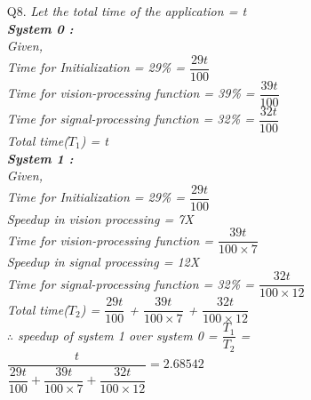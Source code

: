 \documentclass[letterpaper]{article}
\begin{document}
\begin{large}
\begin{flushleft}
\begin{enumerate}
\item[Q8.]
\textit{Let the total time of the application = t\\[0.05in]
\textbf{System 0 :}\\[0.05in]
Given,\\[0.05in]
Time for Initialization = 29\% = $\dfrac{29t}{100}$\\[0.05in]
Time for vision-processing function = 39\% = $\dfrac{39t}{100}$\\[0.05in]
Time for signal-processing function = 32\% = $\dfrac{32t}{100}$\\[0.05in]
Total time($T_1$) = t\\[0.1in]
\textbf{System 1 :}\\[0.05in]
Given,\\[0.05in]
Time for Initialization = 29\% = $\dfrac{29t}{100}$\\[0.05in]
Speedup in vision processing = 7X\\[0.05in]
Time for vision-processing function = $\dfrac{39t}{100\times 7}$\\[0.05in]
Speedup in signal processing = 12X\\[0.05in]
Time for signal-processing function = 32\% = $\dfrac{32t}{100\times 12}$\\[0.05in]
Total time($T_2$) = $\dfrac{29t}{100}$ + $\dfrac{39t}{100\times 7}$ + $\dfrac{32t}{100\times 12}$\\[0.1in]
$\therefore$ speedup of system 1 over system 0 = $\dfrac{T_1}{T_2}$ = $\dfrac{t}{\dfrac{29t}{100} + \dfrac{39t}{100\times 7} + \dfrac{32t}{100\times 12}} = 2.68542 $}


\end{enumerate}
\end{flushleft}
\end{large}
\end{document}
